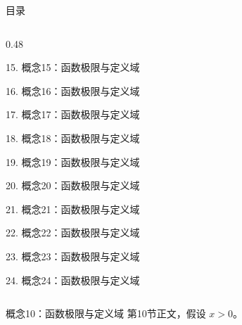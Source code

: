 \documentclass[aspectratio=169,10pt,fontset=fandol]{ctexbeamer}
\begin{document}
\begin{frame}[t,fragile]{目录}
\begin{columns}[T,onlytextwidth]
\begin{column}{0.48\textwidth}
{\color{gray!40}\small 15. 概念15：函数极限与定义域\par}\vspace{0.22em}
{\color{gray!40}\small 16. 概念16：函数极限与定义域\par}\vspace{0.22em}
{\color{gray!40}\small 17. 概念17：函数极限与定义域\par}\vspace{0.22em}
{\color{gray!40}\small 18. 概念18：函数极限与定义域\par}\vspace{0.22em}
{\color{gray!40}\small 19. 概念19：函数极限与定义域\par}\vspace{0.22em}
{\color{gray!40}\small 20. 概念20：函数极限与定义域\par}\vspace{0.22em}
{\color{gray!40}\small 21. 概念21：函数极限与定义域\par}\vspace{0.22em}
{\color{gray!40}\small 22. 概念22：函数极限与定义域\par}\vspace{0.22em}
{\color{gray!40}\small 23. 概念23：函数极限与定义域\par}\vspace{0.22em}
{\color{gray!40}\small 24. 概念24：函数极限与定义域\par}\vspace{0.22em}
\end{column}
\end{columns}
\end{frame}
\begin{frame}[t,fragile]{概念10：函数极限与定义域}
\normalsize
{\normalsize
第10节正文，假设 $x>0$。
}
\end{frame}
\end{document}
